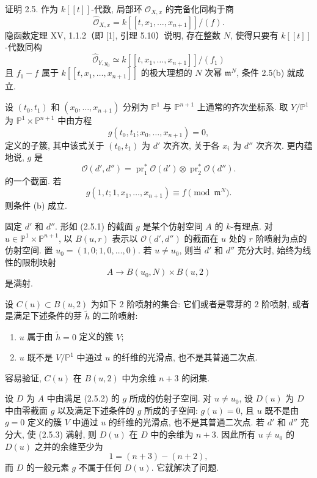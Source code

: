 证明 2.5. 作为 $k[[t]]$-代数, 局部环 $\mathcal O_{X,x}$ 的完备化同构于商
\[
\widehat{\mathcal O}_{X,x}
=k[[t,x_1,\ldots,x_{n+1}]]/(f).
\]
隐函数定理 XV, 1.1.2（即 [1], 引理 5.10）说明, 存在整数 $N$, 使得只要有 $k[[t]]$-代数同构
\[
\widehat{\mathcal O}_{Y,y_0}
\simeq k[[t,x_1,\ldots,x_{n+1}]]/(f_1)
\]
且 $f_1-f$ 属于 $k[[t,x_1,\ldots,x_{n+1}]]$ 的极大理想的 $N$ 次幂 $\mathfrak m^N$, 条件 2.5(b) 就成立.

设 $(t_0,t_1)$ 和 $(x_0,\ldots,x_{n+1})$ 分别为 $\mathbb P^1$ 与 $\mathbb P^{n+1}$ 上通常的齐次坐标系. 取 $Y/\mathbb P^1$ 为 $\mathbb P^1\times\mathbb P^{n+1}$ 中由方程
\begin{equation}\tag{2.5.1}
g(t_0,t_1;x_0,\ldots,x_{n+1})=0,
\end{equation}
定义的子簇, 其中该式关于 $(t_0,t_1)$ 为 $d'$ 次齐次, 关于各 $x_i$ 为 $d''$ 次齐次. 更内蕴地说, $g$ 是
\[
\mathcal O(d',d'')=\operatorname{pr}_1^*\mathcal O(d')
\otimes\operatorname{pr}_2^*\mathcal O(d'').
\]
的一个截面. 若
\begin{equation}\tag{2.5.2}
g(1,t;1,x_1,\ldots,x_{n+1})\equiv f\pmod{\mathfrak m^N}.
\end{equation}
则条件 (b) 成立.

固定 $d'$ 和 $d''$. 形如 (2.5.1) 的截面 $g$ 是某个仿射空间 $A$ 的 $k$-有理点. 对 $u\in\mathbb P^1\times\mathbb P^{n+1}$, 以 $B(u,r)$ 表示以 $\mathcal O(d',d'')$ 的截面在 $u$ 处的 $r$ 阶喷射为点的仿射空间. 置 $u_0=(1,0;1,0,\ldots,0)$. 若 $u\ne u_0$, 则当 $d'$ 和 $d''$ 充分大时, 始终为线性的限制映射
\begin{equation}\tag{2.5.3}
A\longrightarrow B(u_0,N)\times B(u,2)
\end{equation}
是满射.

设 $C(u)\subset B(u,2)$ 为如下 $2$ 阶喷射的集合: 它们或者是零芽的 $2$ 阶喷射, 或者是满足下述条件的芽 $\widetilde h$ 的二阶喷射:
\begin{enumerate}
\item[(a)] $u$ 属于由 $\widetilde h=0$ 定义的簇 $V$;
\item[(b)] $u$ 既不是 $V/\mathbb P^1$ 中通过 $u$ 的纤维的光滑点, 也不是其普通二次点.
\end{enumerate}
容易验证, $C(u)$ 在 $B(u,2)$ 中为余维 $n+3$ 的闭集.

设 $D$ 为 $A$ 中由满足 (2.5.2) 的 $g$ 所成的仿射子空间. 对 $u\ne u_0$, 设 $D(u)$ 为 $D$ 中由零截面 $g$ 以及满足下述条件的 $g$ 所成的子空间: $g(u)=0$, 且 $u$ 既不是由 $g=0$ 定义的簇 $V$ 中通过 $u$ 的纤维的光滑点, 也不是其普通二次点. 若 $d'$ 和 $d''$ 充分大, 使 (2.5.3) 满射, 则 $D(u)$ 在 $D$ 中的余维为 $n+3$. 因此所有 $u\ne u_0$ 的 $D(u)$ 之并的余维至少为
\[
1=(n+3)-(n+2),
\]
而 $D$ 的一般元素 $g$ 不属于任何 $D(u)$. 它就解决了问题.

